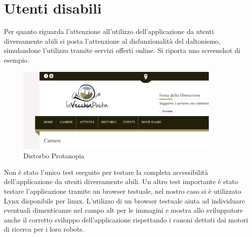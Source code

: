 \documentclass[a4paper,12pt,hidelinks]{report}
\begin{document}
\newpage
\section*{Utenti disabili}
Per quanto riguarda l'attenzione all'utilizzo dell'applicazione da utenti diversamente abili si posta l'attenzione al disfunzionalità del daltonismo, simulandone l'utilizzo 
tramite servizi offerti online. Si riporta uno screenshot di esempio.

\begin{figure}[h!]%
    \includegraphics[width=0.9\textwidth,keepaspectratio=true]{../img/daltonismo}
    \centering
    \caption{Distorbo Protanopia}%
    \label{fig:daltonismo}%
\end{figure}
\par Non è stato l'unico test eseguito per testare la completa accessibilità dell'applicazione da utenti diversamente abili. Un altro test importante è stato testare l'applicazione
tramite un browser testuale, nel nostro caso si è utilizzato Lynx disponibile per linux. L'utilizzo di un browser testuale aiuta ad individuare eventuali dimenticanze nel campo alt per 
le immagini e mostra allo sviluppatore anche il corretto sviluppo dell'applicazione rispettando i canoni dettati dai motori di ricerca per i loro robots.
\end{document}
